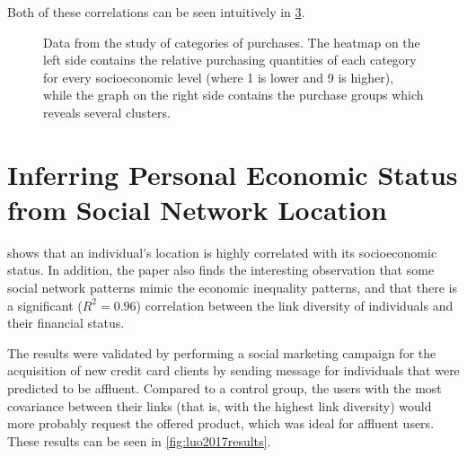 Both of these correlations can be seen intuitively in \cref{fig:paper_yannick}.

\begin{figure}
\centering
\begin{subfigure}[t]{.45\textwidth}
\label{fig:service_socioeconomic}
\end{subfigure}
\begin{subfigure}[t]{.45\textwidth}
\label{fig:service_service}
\end{subfigure}
\caption{Data from the study of categories of purchases. The heatmap on the left side contains the relative purchasing quantities of each category for every socioeconomic level (where 1 is lower and 9 is higher), while the graph on the right side contains the purchase groups which reveals several clusters.}
\label{fig:paper_yannick}
\end{figure}

\section{Inferring Personal Economic Status from Social Network Location}

\cite{Luo2017inferring} shows that an individual's location is highly correlated with its socioeconomic status.
In addition, the paper also finds the interesting observation that some social network patterns mimic the economic inequality patterns, and that there is a significant ($R^2 = 0.96$) correlation between the link diversity of individuals and their financial status.

The results were validated by performing a social marketing campaign for the acquisition of new credit card clients by sending message for individuals that were predicted to be affluent.
Compared to a control group, the users with the most covariance between their links (that is, with the highest link diversity) would more probably request the offered product, which was ideal for affluent users. These results can be seen in \cref{fig:luo2017results}.

